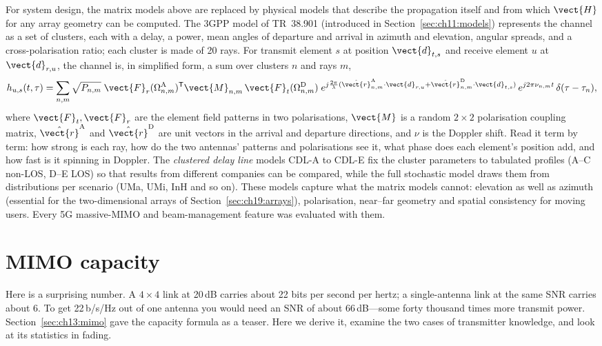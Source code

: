 For system design, the matrix models above are replaced by physical models that describe the
propagation itself and from which $\vect{H}$ for any array geometry can be computed. The 3GPP
model of TR~38.901 (introduced in Section~\ref{sec:ch11:models}) represents the channel as a set of
clusters, each with a delay, a power, mean angles of departure and arrival in azimuth and
elevation, angular spreads, and a cross-polarisation ratio; each cluster is made of 20 rays. For
transmit element $s$ at position $\vect{d}_{t,s}$ and receive element $u$ at $\vect{d}_{r,u}$, the
channel is, in simplified form, a sum over clusters $n$ and rays $m$,
\begin{equation}
h_{u,s}(t,\tau)=\sum_{n,m}\sqrt{P_{n,m}}\;
\vect{F}_{r}(\Omega^{\text{A}}_{n,m})^{\mathsf T}\vect{M}_{n,m}\,\vect{F}_{t}(\Omega^{\text{D}}_{n,m})\;
e^{j\frac{2\pi}{\lambda}(\hat{\vect{r}}^{\text{A}}_{n,m}\cdot\vect{d}_{r,u}+\hat{\vect{r}}^{\text{D}}_{n,m}\cdot\vect{d}_{t,s})}\,
e^{j2\pi\nu_{n,m}t}\,\delta(\tau-\tau_n),
\end{equation}
where $\vect{F}_t,\vect{F}_r$ are the element field patterns in two polarisations, $\vect{M}$ is a
random $2\times2$ polarisation coupling matrix, $\hat{\vect{r}}^{\text{A}}$ and $\hat{\vect{r}}^{\text{D}}$
are unit vectors in the arrival and departure directions, and $\nu$ is the Doppler shift. Read it
term by term: how strong is each ray, how do the two antennas' patterns and polarisations see it,
what phase does each element's position add, and how fast is it spinning in Doppler. The
\emph{clustered delay line} models CDL-A to CDL-E fix the cluster parameters to tabulated profiles
(A--C non-LOS, D--E LOS) so that results from different companies can be compared, while the full
stochastic model draws them from distributions per scenario (UMa, UMi, InH and so on). These models
capture what the matrix models cannot: elevation as well as azimuth (essential for the
two-dimensional arrays of Section~\ref{sec:ch19:arrays}), polarisation, near--far geometry and
spatial consistency for moving users. Every 5G massive-MIMO and beam-management feature was
evaluated with them.

\section{MIMO capacity}
\label{sec:ch19:capacity}

Here is a surprising number. A $4\times4$ link at 20\,dB carries about 22 bits per second per
hertz; a single-antenna link at the same SNR carries about 6. To get 22\,b/s/Hz out of one antenna
you would need an SNR of about 66\,dB---some forty thousand times more transmit power. Section~\ref{sec:ch13:mimo}
gave the capacity formula as a teaser. Here we derive it, examine the two cases of transmitter
knowledge, and look at its statistics in fading.

